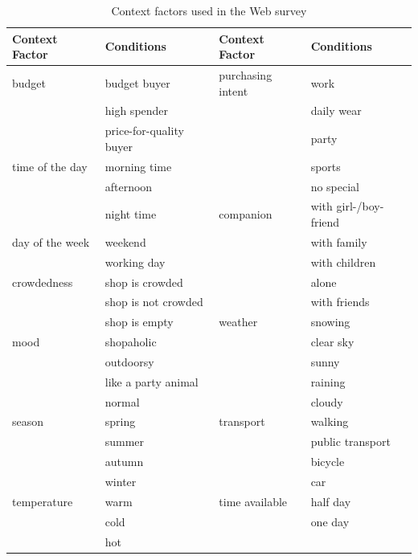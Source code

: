 \begin{table}[H]
	\centering
	\caption{Context factors used in the Web survey}
	\label{tab:factors}
	\begin{tabular}{p{1.1in}p{1.6in}|p{1.1in}p{1.6in}} \hline
		Context Factor & Conditions  & Context Factor & Conditions  \\ \hline 
		budget & budget buyer & purchasing intent & work \\
 		& high spender &  & daily wear \\
 		& price-for-quality buyer &  & party \\
		time of the day & morning time &  & sports \\
 		& afternoon &  & no special \\
 		& night time & companion & with girl-/boy-friend \\
		day of the week & weekend &  & with family  \\
		& working day &  & with children \\
		crowdedness & shop is crowded &  & alone \\
		& shop is not crowded &  & with friends \\
		& shop is empty & weather  & snowing \\
		mood & shopaholic &  & clear sky \\
		& outdoorsy &  & sunny \\
		& like a party animal &  & raining \\
		& normal &  & cloudy \\	
		season & spring & transport & walking \\
 		& summer &  & public transport \\
 		& autumn &  & bicycle \\
 		& winter &  & car \\
		temperature & warm & time available & half day \\
 		& cold &  & one day \\
 		& hot \\ \hline
	\end{tabular}
\end{table}


